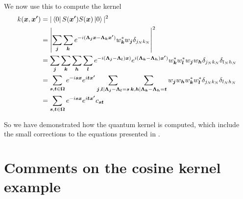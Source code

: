 \documentclass{article}
\begin{document}
\normalsize
We now use this to compute the kernel
\begin{align}
	k(\boldsymbol{x},\boldsymbol{x'}) &= |\bra{0}S(\boldsymbol{x'})S(\boldsymbol{x})\ket{0}|^2 \\
	&= \left|\sum_{\boldsymbol{j}}\sum_{\boldsymbol{k}}e^{-i(\boldsymbol{\Lambda_j}\boldsymbol{x}-\boldsymbol{\Lambda_k}\boldsymbol{x'})}w^*_{\boldsymbol{k}}w_{\boldsymbol{j}}\delta_{j_Nk_N}\right|^2\\
	&= \sum_{\boldsymbol{j}}\sum_{\boldsymbol{k}}\sum_{\boldsymbol{h}}\sum_{\boldsymbol{l}}e^{-i(\boldsymbol{\Lambda_j}-\boldsymbol{\Lambda_l})\boldsymbol{x})}e^{i(\boldsymbol{\Lambda_k}-\boldsymbol{\Lambda_h})\boldsymbol{x'})}w^*_{\boldsymbol{k}}w^*_{\boldsymbol{l}}w_{\boldsymbol{j}}w_{\boldsymbol{h}}\delta_{j_Nk_N}\delta_{l_Nh_N} \\
	&= \sum_{\boldsymbol{s},\boldsymbol{t} \in \boldsymbol{\Omega}}e^{-i\boldsymbol{s}\boldsymbol{x}}e^{i\boldsymbol{t}\boldsymbol{x'}} \sum_{\boldsymbol{j},\boldsymbol{l}|\boldsymbol{\Lambda_j}-\boldsymbol{\Lambda_l}=\boldsymbol{s}}\sum_{\boldsymbol{k},\boldsymbol{h}|\boldsymbol{\Lambda_k}-\boldsymbol{\Lambda_h}=\boldsymbol{t}}w_{\boldsymbol{j}}w_{\boldsymbol{h}}w^*_{\boldsymbol{k}}w^*_{\boldsymbol{l}}\delta_{j_Nk_N}\delta_{l_Nh_N}\\
	&= \sum_{\boldsymbol{s},\boldsymbol{t} \in \boldsymbol{\Omega}}e^{-i\boldsymbol{s}\boldsymbol{x}}e^{i\boldsymbol{t}\boldsymbol{x'}}c_{\boldsymbol{s}\boldsymbol{t}}
\end{align}


So we have demonstrated how the quantum kernel is computed, which include the small corrections to the equations presented in \cite{maria}.


\section{Comments on the cosine kernel example}
\end{document}
